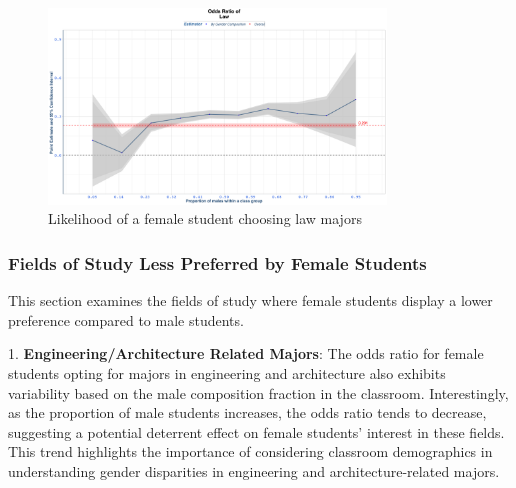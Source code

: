 \begin{figure}[htbp]
\centering
\includegraphics[width=0.8\textwidth]{Graph/Results/fe_panel_student_gender_composition_wome_in_LAW_bce.png}
\caption{Likelihood of a female student choosing law majors}
\label{fig:law}
\end{figure}

\subsubsection{Fields of Study  Less Preferred by Female Students}\label{subsec:less_preferred_female}

This section examines the fields of study  where female students display a lower preference compared to male students.



 


1. \textbf{Engineering/Architecture Related Majors}: The odds ratio for female students opting for majors in engineering and architecture also exhibits variability based on the male composition fraction in the classroom. Interestingly, as the proportion of male students increases, the odds ratio tends to decrease, suggesting a potential deterrent effect on female students' interest in these fields. This trend highlights the importance of considering classroom demographics in understanding gender disparities in engineering and architecture-related majors.

